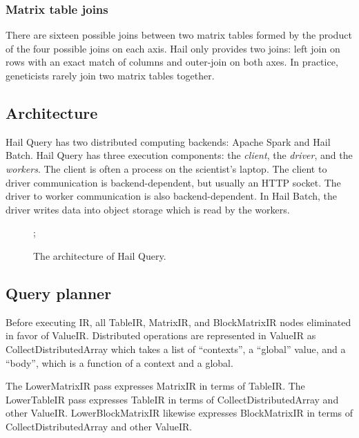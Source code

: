\documentclass[sigconf, nonacm]{acmart}
\begin{document}
\subsubsection{Matrix table joins}

There are sixteen possible joins between two matrix tables formed by the product of the four
possible joins on each axis. Hail only provides two joins: left join on rows with an exact match of
columns and outer-join on both axes. In practice, geneticists rarely join two matrix tables
together.

\subsection{Architecture}

Hail Query has two distributed computing backends: Apache Spark and Hail Batch. Hail Query has three
execution components: the \emph{client}, the \emph{driver}, and the \emph{workers}. The client is
often a process on the scientist's laptop. The client to driver communication is backend-dependent,
but usually an HTTP socket. The driver to worker communication is also backend-dependent. In Hail
Batch, the driver writes data into object storage which is read by the workers.

\begin{figure}[h]
  ;
  \caption{The architecture of Hail Query.}
  \label{fig:architecture-of-hail}
\end{figure}


\subsection{Query planner}

Before executing IR, all TableIR, MatrixIR, and BlockMatrixIR nodes eliminated in favor of
ValueIR. Distributed operations are represented in ValueIR as CollectDistributedArray which takes a
list of ``contexts'', a ``global'' value, and a ``body'', which is a function of a context and a
global.

The LowerMatrixIR pass expresses MatrixIR in terms of TableIR. The LowerTableIR pass expresses
TableIR in terms of CollectDistributedArray and other ValueIR. LowerBlockMatrixIR likewise expresses
BlockMatrixIR in terms of CollectDistributedArray and other ValueIR.
\end{document}
